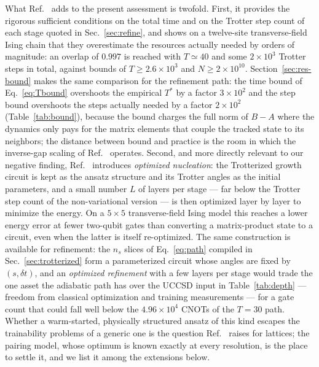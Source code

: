 \documentclass[
  aps,            %
  prc,            %
  reprint,        %
  superscriptaddress,
  floatfix,
  nofootinbib
]{revtex4-2}
\begin{document}
What Ref.~\cite{Sadia2026} adds to the present assessment is twofold.  First,
it provides the rigorous sufficient conditions on the total time and on the
Trotter step count of each stage quoted in Sec.~\ref{sec:refine}, and shows on
a twelve-site transverse-field Ising chain that they overestimate the
resources actually needed by orders of magnitude: an overlap of $0.997$ is
reached with $T\simeq40$ and some $2\times10^{3}$ Trotter steps in total,
against bounds of $T\ge2.6\times10^{3}$ and $N\ge2\times10^{10}$.  Section~\ref{sec:res-bound} makes the same comparison for the refinement
path: the time bound of Eq.~\eqref{eq:Tbound} overshoots the empirical
$T^{*}$ by a factor $3\times10^{2}$ and the step bound overshoots
the steps actually needed by a factor $2\times10^{2}$
(Table~\ref{tab:bound}), because the bound charges the full norm of $B-A$
where the dynamics only pays for the matrix elements that couple the tracked
state to its neighbors; the distance between bound and practice is the room
in which the inverse-gap scaling of Ref.~\cite{Bogner2026} operates.  Second, and more directly
relevant to our negative finding, Ref.~\cite{Sadia2026} introduces
\emph{optimized nucleation}: the Trotterized growth circuit is kept as the
ansatz structure and its Trotter angles as the initial parameters, and a
small number $L$ of layers per stage --- far below the Trotter step count of
the non-variational version --- is then optimized layer by layer to minimize
the energy.  On a $5\times5$ transverse-field Ising model this reaches a
lower energy error at fewer two-qubit gates than converting a matrix-product
state to a circuit, even when the latter is itself re-optimized.  The same
construction is available for refinement: the $n_s$ slices of
Eq.~\eqref{eq:path} compiled in Sec.~\ref{sec:trotterized} form a
parameterized circuit whose angles are fixed by $(s,\delta t)$, and an
\emph{optimized refinement} with a few layers per stage would trade the one
asset the adiabatic path has over the UCCSD input in Table~\ref{tab:depth}
--- freedom from classical optimization and training measurements --- for a
gate count that could fall well below the $4.96\times10^{4}$ CNOTs of the
$T=30$ path.  Whether a warm-started, physically structured ansatz of this
kind escapes the trainability problems of a generic one is the question
Ref.~\cite{Sadia2026} raises for lattices; the pairing model, whose optimum
is known exactly at every resolution, is the place to settle it, and we list
it among the extensions below.
\end{document}
